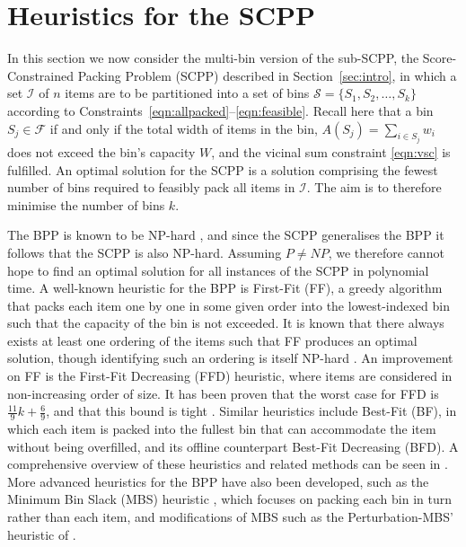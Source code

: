 \documentclass[a4paper,11pt,authoryear]{elsarticle}
\begin{document}
\section{Heuristics for the SCPP}
\label{sec:heur}
\noindent In this section we now consider the multi-bin version of the sub-SCPP, the Score-Constrained Packing Problem (SCPP) described in Section~\ref{sec:intro}, in which a set $\mathcal{I}$ of $n$ items are to be partitioned into a set of bins $\mathcal{S} = \{S_1, S_2,\dotsc,S_k\}$ according to Constraints~\eqref{eqn:allpacked}--\eqref{eqn:feasible}. Recall here that a bin $S_j \in \mathcal{F}$ if and only if the total width of items in the bin, $A(S_j) = \sum_{i \in S_j} w_i$ does not exceed the bin's capacity $W$, and the vicinal sum constraint \eqref{eqn:vsc} is fulfilled. An optimal solution for the SCPP is a solution comprising the fewest number of bins required to feasibly pack all items in $\mathcal{I}$. The aim is to therefore minimise the number of bins $k$.

The BPP is known to be NP-hard \citep{garey1979}, and since the SCPP generalises the BPP it follows that the SCPP is also NP-hard. Assuming $P \neq NP$, we therefore cannot hope to find an optimal solution for all instances of the SCPP in polynomial time. A well-known heuristic for the BPP is First-Fit (FF), a greedy algorithm that packs each item one by one in some given order into the lowest-indexed bin such that the capacity of the bin is not exceeded. It is known that there always exists at least one ordering of the items such that FF produces an optimal solution, though identifying such an ordering is itself NP-hard \citep{lewis2009}. An improvement on FF is the First-Fit Decreasing (FFD) heuristic, where items are considered in non-increasing order of size. It has been proven that the worst case for FFD is $\frac{11}{9}k + \frac{6}{9}$, and that this bound is tight \cite{dosa2007}. Similar heuristics include Best-Fit (BF), in which each item is packed into the fullest bin that can accommodate the item without being overfilled, and its offline counterpart Best-Fit Decreasing (BFD). A comprehensive overview of these heuristics and related methods can be seen in \cite{coffman1984}. More advanced heuristics for the BPP have also been developed, such as the Minimum Bin Slack (MBS) heuristic \citep{gupta1999}, which focuses on packing each bin in turn rather than each item, and modifications of MBS such as the Perturbation-MBS' heuristic of \cite{fleszar2002}.
\end{document}
